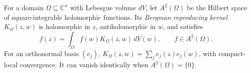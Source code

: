 
For a domain $\Omega\subseteq\mathbb C^n$ with Lebesgue volume $dV$, let $A^2(\Omega)$ be the Hilbert space of square-integrable holomorphic functions. Its \emph{Bergman reproducing kernel} $K_\Omega(z,w)$ is holomorphic in $z$, antiholomorphic in $w$, and satisfies
\[
f(z)=\int_\Omega f(w)K_\Omega(z,w)\,dV(w),\qquad f\in A^2(\Omega).
\]
For an orthonormal basis $(e_j)$, $K_\Omega(z,w)=\sum_j e_j(z)\overline{e_j(w)}$, with compact-local convergence. It can vanish identically when $A^2(\Omega)=\{0\}$.
